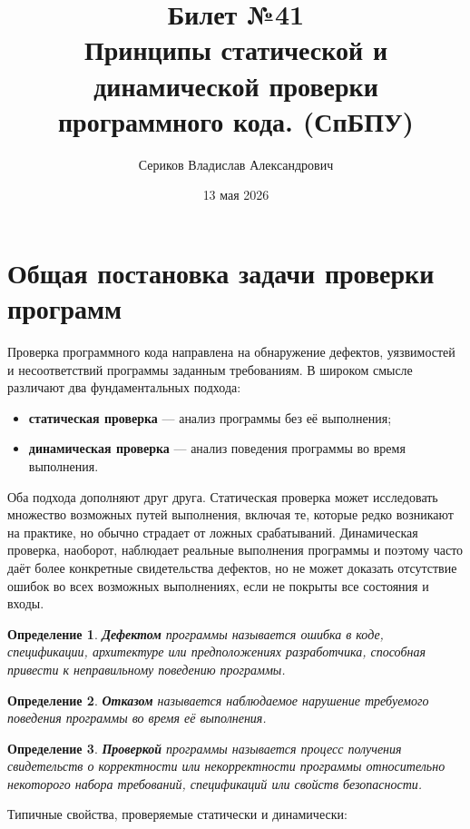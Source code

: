 \documentclass[12pt,a4paper]{article}
\title{Билет №41 \\ \small Принципы статической и динамической проверки программного кода. (СпБПУ)}
\author{Сериков Владислав Александрович}
\date{13 мая 2026}
\newtheorem{definition}{Определение}
\begin{document}
\maketitle
\tableofcontents
\newpage

\section{Общая постановка задачи проверки программ}

Проверка программного кода направлена на обнаружение дефектов, уязвимостей и несоответствий программы заданным требованиям. В широком смысле различают два фундаментальных подхода:

\begin{itemize}
  \item \textbf{статическая проверка} --- анализ программы без её выполнения;
  \item \textbf{динамическая проверка} --- анализ поведения программы во время выполнения.
\end{itemize}

Оба подхода дополняют друг друга. Статическая проверка может исследовать множество возможных путей выполнения, включая те, которые редко возникают на практике, но обычно страдает от ложных срабатываний. Динамическая проверка, наоборот, наблюдает реальные выполнения программы и поэтому часто даёт более конкретные свидетельства дефектов, но не может доказать отсутствие ошибок во всех возможных выполнениях, если не покрыты все состояния и входы.

\begin{definition}
\textbf{Дефектом} программы называется ошибка в коде, спецификации, архитектуре или предположениях разработчика, способная привести к неправильному поведению программы.
\end{definition}

\begin{definition}
\textbf{Отказом} называется наблюдаемое нарушение требуемого поведения программы во время её выполнения.
\end{definition}

\begin{definition}
\textbf{Проверкой} программы называется процесс получения свидетельств о корректности или некорректности программы относительно некоторого набора требований, спецификаций или свойств безопасности.
\end{definition}

Типичные свойства, проверяемые статически и динамически:
\end{document}
